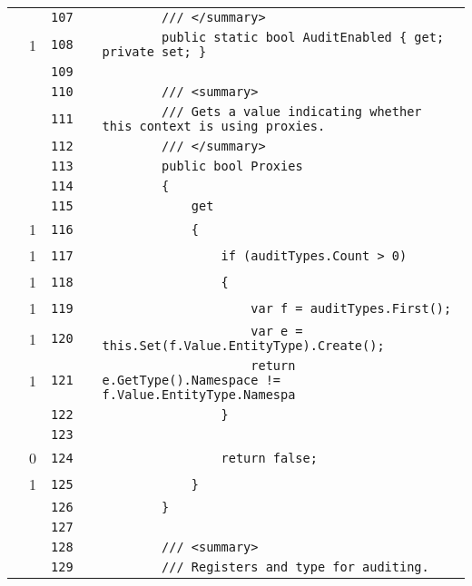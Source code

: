 \documentclass[a4paper,10pt]{article}
\begin{document}
\begin{longtable}[l]{lrrll}
\cellcolor{gray} &  & \verb~107~ & & \verb~        /// </summary>~\\
\cellcolor{green} & 1 & \verb~108~ & & \verb~        public static bool AuditEnabled { get; private set; }~\\
\cellcolor{gray} &  & \verb~109~ & & \verb~~\\
\cellcolor{gray} &  & \verb~110~ & & \verb~        /// <summary>~\\
\cellcolor{gray} &  & \verb~111~ & & \verb~        /// Gets a value indicating whether this context is using proxies.~\\
\cellcolor{gray} &  & \verb~112~ & & \verb~        /// </summary>~\\
\cellcolor{gray} &  & \verb~113~ & & \verb~        public bool Proxies~\\
\cellcolor{gray} &  & \verb~114~ & & \verb~        {~\\
\cellcolor{gray} &  & \verb~115~ & & \verb~            get~\\
\cellcolor{green} & 1 & \verb~116~ & & \verb~            {~\\
\cellcolor{green} & 1 & \verb~117~ & & \verb~                if (auditTypes.Count > 0)~\\
\cellcolor{green} & 1 & \verb~118~ & & \verb~                {~\\
\cellcolor{green} & 1 & \verb~119~ & & \verb~                    var f = auditTypes.First();~\\
\cellcolor{green} & 1 & \verb~120~ & & \verb~                    var e = this.Set(f.Value.EntityType).Create();~\\
\cellcolor{green} & 1 & \verb~121~ & & \verb~                    return e.GetType().Namespace != f.Value.EntityType.Namespa~\\
\cellcolor{gray} &  & \verb~122~ & & \verb~                }~\\
\cellcolor{gray} &  & \verb~123~ & & \verb~~\\
\cellcolor{red} & 0 & \verb~124~ & & \verb~                return false;~\\
\cellcolor{green} & 1 & \verb~125~ & & \verb~            }~\\
\cellcolor{gray} &  & \verb~126~ & & \verb~        }~\\
\cellcolor{gray} &  & \verb~127~ & & \verb~~\\
\cellcolor{gray} &  & \verb~128~ & & \verb~        /// <summary>~\\
\cellcolor{gray} &  & \verb~129~ & & \verb~        /// Registers and type for auditing.~\\

\end{longtable}
\end{document}
